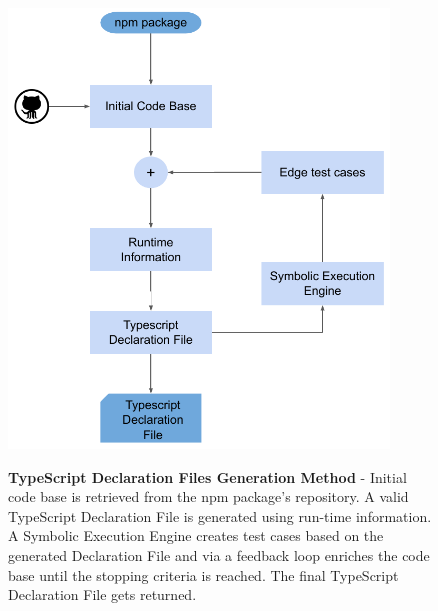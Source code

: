 \begin{figure}[h]
\begin{centering}
    {\includegraphics[width=0.9\textwidth]{figures/approach/typescript-declaration-files-generation-method/typescript_declaration_files_generation_method_block_diagram.pdf}}
    \caption[TypeScript Declaration Files Generation Method]{\textbf{TypeScript Declaration Files Generation Method} - Initial code base is retrieved from the npm package's repository. A valid TypeScript Declaration File is generated using run-time information. A Symbolic Execution Engine creates test cases based on the generated Declaration File and via a feedback loop enriches the code base until the stopping criteria is reached. The final TypeScript Declaration File gets returned.}
    \label{fig:tsd_generation_method_block_diagram}
\end{centering}
\end{figure}
